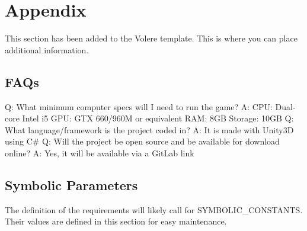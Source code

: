 \documentclass[12pt, titlepage]{article}
\begin{document}







\newpage

\section{Appendix}

This section has been added to the Volere template.  This is where you can place
additional information.

\subsection{FAQs}

Q: What minimum computer specs will I need to run the game?
\newline
A: CPU: Dual-core Intel i5    
GPU: GTX 660/960M or equivalent
RAM: 8GB
Storage: 10GB
\newline
\newline
Q: What language/framework is the project coded in?
\newline
A: It is made with Unity3D using C\#
\newline
\newline
Q: Will the project be open source and be available for download online?
\newline
A: Yes, it will be available via a GitLab link

\subsection{Symbolic Parameters}

The definition of the requirements will likely call for SYMBOLIC\_CONSTANTS.
Their values are defined in this section for easy maintenance.
\end{document}
